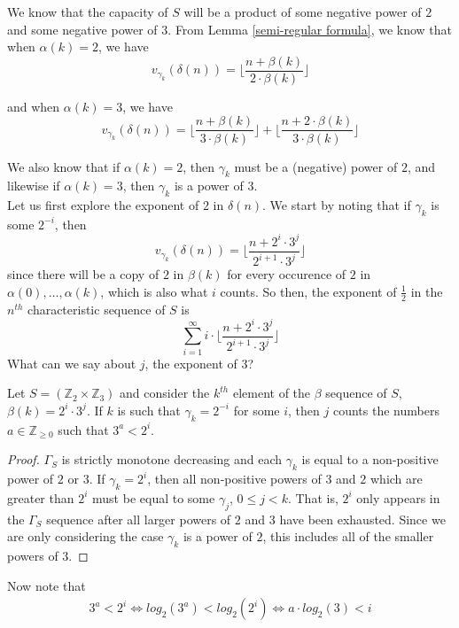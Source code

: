 We know that the capacity of $S$ will be a product of some negative power of $2$ and some negative power of $3$.  From Lemma \ref{semi-regular formula}, we know that when $\alpha(k)=2$, we have 
\[v_{\gamma_k}(\delta(n)) = \lfloor \frac{n + \beta(k)}{2\cdot \beta(k)} \rfloor\]

and when $\alpha(k)=3$, we have
\[v_{\gamma_k}(\delta(n)) = \lfloor \frac{n + \beta(k)}{3\cdot \beta(k)} \rfloor + \lfloor \frac{n + 2\cdot \beta(k)}{3\cdot \beta(k)} \rfloor \]

We also know that if $\alpha(k)=2$, then $\gamma_k$ must be a (negative) power of $2$, and likewise if $\alpha(k)=3$, then $\gamma_k$ is a power of $3$.\\

 Let us first explore the exponent of $2$ in $\delta(n)$. We start by noting that if $\gamma_k$ is some $2^{-i}$, then \[v_{\gamma_k}(\delta(n)) =\lfloor \frac{n + 2^i\cdot 3 ^j}{2^{i+1} \cdot 3^j} \rfloor \] since there will be a copy of $2$ in $\beta(k)$ for every occurence of $2$ in $\alpha(0),\ldots,\alpha(k)$, which is also what $i$ counts. So then, the exponent of $\frac{1}{2}$ in the $n^{th}$ characteristic sequence of $S$ is \[ \sum_{i=1}^\infty i \cdot \lfloor\frac{n + 2^i \cdot 3^j}{2^{i+1}\cdot 3^j} \rfloor\] What can we say about $j$, the exponent of $3$? 

\begin{lemma}
Let $S = (\mathbb{Z}_{2} \times \mathbb{Z}_{3}) $ and consider the $k^{th}$ element of the $\beta$ sequence of $S$, $\beta(k) = 2^i \cdot 3^j$. If $k$ is such that $\gamma_k=2^{-i}$ for some $i$, then $j$ counts the numbers $a \in \mathbb{Z}_{\geq 0}$ such that $3^a < 2^{i}$.
\end{lemma}

\begin{proof}
$\Gamma_S$ is strictly monotone decreasing and each $\gamma_k$ is equal to a non-positive power of $2$ or $3$. If $\gamma_k = 2^i$, then all non-positive powers of $3$ and $2$ which are greater than $2^i$ must be equal to some $\gamma_j$, $0 \leq j < k$. That is, $2^i$ only appears in the $\Gamma_S$ sequence after all larger powers of $2$ and $3$ have been exhausted. Since we are only considering the case $\gamma_k$ is a power of $2$, this includes all of the smaller powers of $3$.
\end{proof}

 Now note that  
\begin{align*}
3^a < 2^i
 \iff
 log_2(3^a) < log_2(2^i)
\iff  
a \cdot log_2(3) < i
\end{align*}

